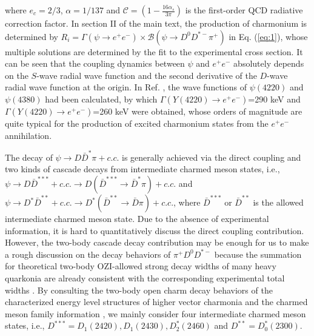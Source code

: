 \documentclass[final,5p,times,twocolumn]{elsarticle}
\begin{document}
where $e_c=2/3$, $\alpha=1/137$ and $\mathcal{C}=(1-\frac{16\alpha_s}{3\pi})$ is the first-order QCD radiative correction factor. In section II of the main text, the production of charmonium is determined by $R_i=\Gamma(\psi \to e^+e^-)\times\mathcal{B}(\psi \to D^0D^{*-}\pi^+)$ in Eq. (\ref{eq:1}), whose multiple solutions are determined by the fit to the experimental cross section.  It can be seen that the coupling dynamics between $\psi$ and $e^+e^-$ absolutely depends on the $S$-wave radial wave function and the second derivative of the $D$-wave radial wave function  at the origin. In Ref. \cite{Wang:2019mhs}, the wave functions of $\psi(4220)$ and $\psi(4380)$ had been calculated, by which $\Gamma(Y(4220)\to e^+e^-)$=290 keV and $\Gamma(Y(4220)\to e^+e^-)$=260 keV were obtained, whose orders of magnitude are quite typical for the production of excited charmonium states from the $e^+e^-$ annihilation. %


The decay of $\psi \to D \bar{D}^{*}\pi+c.c. $ is generally achieved via the direct coupling and two kinds of cascade decays from intermediate charmed meson states, i.e., $\psi \to D \bar{D}^{***} +c.c. \to D (\bar{D}^{***}\to \bar{D}^{*}\pi) +c.c. $ and $\psi \to D^* \bar{D}^{**} +c.c.\to D^* (\bar{D}^{**}\to \bar{D}\pi)+c.c. $, where $\bar{D}^{***}$ or $\bar{D}^{**}$ is the allowed intermediate charmed meson state. Due to the absence of experimental information, it is hard to quantitatively discuss the direct coupling contribution. However, the two-body cascade decay contribution may be enough for us to make a rough discussion on the decay behaviors of $\pi^+ D^0 D^{*-}$ because the summation for theoretical two-body OZI-allowed strong decay widths of many heavy quarkonia are already consistent with the corresponding experimental total widths \cite{Barnes:2005pb,Godfrey:2015dia,Wang:2018rjg}. By consulting the two-body open charm decay behaviors of the characterized energy level structures of higher vector charmonia \cite{Wang:2019mhs} and the charmed meson family information \cite{Song:2015fha}, we mainly consider four intermediate charmed meson states, i.e., $D^{***}=D_1(2420), D_1(2430), D_2^*(2460)$ and $D^{**}=D_0^*(2300)$.
\end{document}
